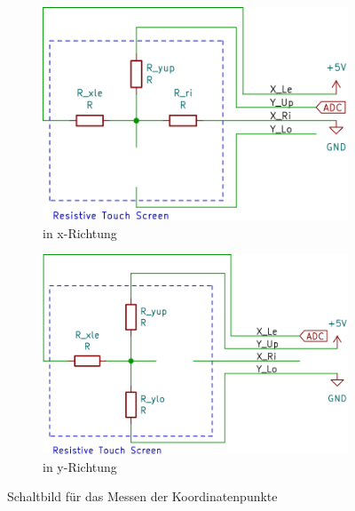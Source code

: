 \begin{figure}[ht!]
    \begin{subfigure}{0.49\textwidth}
        \centering
        \includegraphics[width=\textwidth]{fig/xlesen.png}
        \caption{in x-Richtung}
        \label{fig:xlesen}
    \end{subfigure}
    \hfill
    \begin{subfigure}{0.49\textwidth}
        \centering
        \includegraphics[width=\textwidth]{fig/ylesen.png}
        \caption{in y-Richtung}
        \label{fig:ylesen}
    \end{subfigure}
    \caption{Schaltbild für das Messen der Koordinatenpunkte}
    \label{fig:xylesen}
\end{figure}
